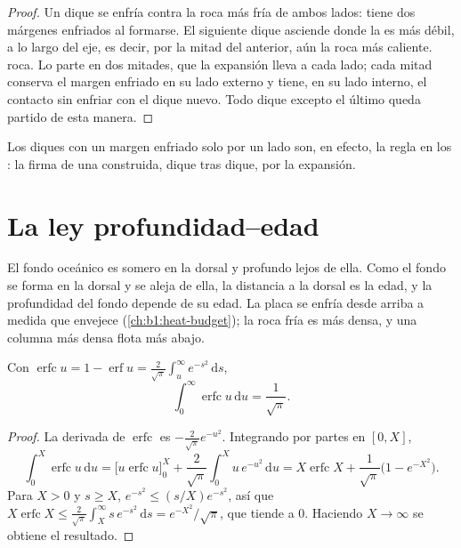 \begin{proof}
Un dique se enfría contra la roca más fría de ambos lados: tiene dos márgenes enfriados al formarse. El siguiente dique asciende donde la
 es más débil, a lo largo del eje, es decir, por la mitad del anterior, aún la roca más caliente.
roca. Lo parte en dos mitades, que la expansión lleva a cada lado; cada mitad conserva el margen enfriado en su lado externo y tiene, en su
lado interno, el contacto sin enfriar con el dique nuevo. Todo dique excepto el último queda partido de esta manera.
\end{proof}

Los diques con un margen enfriado solo por un lado son, en efecto, la regla en los : la firma de una 
construida, dique tras dique, por la expansión.


\section{La ley profundidad--edad}\label{sec:b1:rifts-ridges-margins:depth-age}

El fondo oceánico es somero en la dorsal y profundo lejos de ella. Como el fondo se forma en la dorsal y se aleja de ella, la distancia a la
dorsal es la edad, y la profundidad del fondo depende de su edad. La placa se enfría desde arriba a medida que envejece
(\cref{ch:b1:heat-budget}); la roca fría es más densa, y una columna más densa flota más abajo.

\begin{lemma}\label{lem:b1:rifts-ridges-margins:erfc}
Con $\operatorname{erfc} u = 1 - \operatorname{erf} u =
\frac{2}{\sqrt\pi}\int_u^\infty e^{-s^2}\,\mathrm ds$,
\[
  \int_0^\infty \operatorname{erfc} u \,\mathrm du = \frac{1}{\sqrt\pi}.
\]
\end{lemma}

\begin{proof}
La derivada de $\operatorname{erfc}$ es $-\frac{2}{\sqrt\pi}e^{-u^2}$. Integrando por partes en $[0, X]$,
\[
  \int_0^X \operatorname{erfc} u\,\mathrm du
  = \bigl[u \operatorname{erfc} u\bigr]_0^X + \frac{2}{\sqrt\pi}\int_0^X u\,e^{-u^2}\,\mathrm du
  = X\operatorname{erfc} X + \frac{1}{\sqrt\pi}\bigl(1 - e^{-X^2}\bigr).
\]
Para $X > 0$ y $s \ge X$, $e^{-s^2} \le (s/X)e^{-s^2}$, así que
$X\operatorname{erfc} X \le \frac{2}{\sqrt\pi}\int_X^\infty s\,e^{-s^2}\,\mathrm ds
= e^{-X^2}/\sqrt\pi$, que tiende a 0. Haciendo $X \to \infty$ se obtiene el
resultado.
\end{proof}

